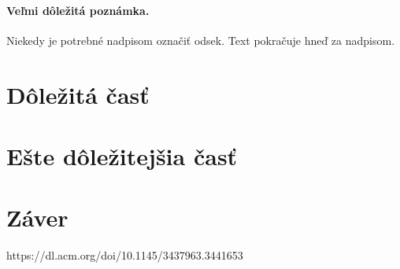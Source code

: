 \documentclass[10pt,twoside,slovak,a4paper]{article}
\begin{document}
\paragraph{Veľmi dôležitá poznámka.}
Niekedy je potrebné nadpisom označiť odsek. Text pokračuje hneď za nadpisom.



\section{Dôležitá časť} \label{dolezita}




\section{Ešte dôležitejšia časť} \label{dolezitejsia}




\section{Záver} \label{zaver} %






https://dl.acm.org/doi/10.1145/3437963.3441653
\end{document}
